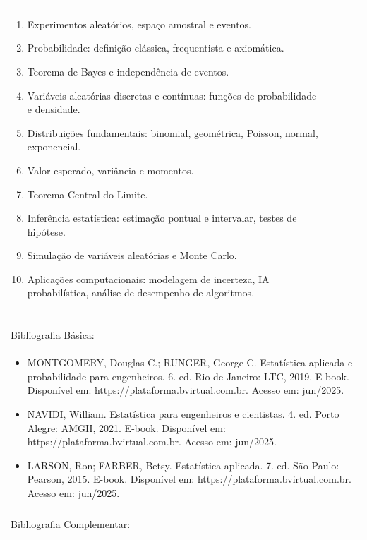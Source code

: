 \documentclass[11pt]{article}
\begin{document}
\begin{center}
\begin{longtable}{|p{4cm}|p{4cm}|p{4cm}|p{4cm}|}
{\begin{enumerate}
\item Experimentos aleatórios, espaço amostral e eventos.
\item Probabilidade: definição clássica, frequentista e axiomática.
\item Teorema de Bayes e independência de eventos.
\item Variáveis aleatórias discretas e contínuas: funções de probabilidade e densidade.
\item Distribuições fundamentais: binomial, geométrica, Poisson, normal, exponencial.
\item Valor esperado, variância e momentos.
\item Teorema Central do Limite.
\item Inferência estatística: estimação pontual e intervalar, testes de hipótese.
\item Simulação de variáveis aleatórias e Monte Carlo.
\item Aplicações computacionais: modelagem de incerteza, IA probabilística, análise de desempenho de algoritmos.\end{enumerate}}\\
\multicolumn{4}{|p{16cm}|}{}\\
\multicolumn{4}{|p{16cm}|}{}\\
\multicolumn{4}{|p{16cm}|}{\vspace{-1cm}}\\
\multicolumn{4}{|p{16cm}|}{}\\
\hline
\multicolumn{4}{|p{16cm}|}{Bibliografia Básica:}\\
\multicolumn{4}{|p{16cm}|}{%
\begin{itemize}\item MONTGOMERY, Douglas C.; RUNGER, George C. Estatística aplicada e probabilidade para engenheiros. 6. ed. Rio de Janeiro: LTC, 2019. E-book. Disponível em: https://plataforma.bvirtual.com.br. Acesso em: jun/2025.
\item NAVIDI, William. Estatística para engenheiros e cientistas. 4. ed. Porto Alegre: AMGH, 2021. E-book. Disponível em: https://plataforma.bvirtual.com.br. Acesso em: jun/2025.
\item LARSON, Ron; FARBER, Betsy. Estatística aplicada. 7. ed. São Paulo: Pearson, 2015. E-book. Disponível em: https://plataforma.bvirtual.com.br. Acesso em: jun/2025.\end{itemize}}\\
\multicolumn{4}{|p{16cm}|}{}\\
\hline
\multicolumn{4}{|p{16cm}|}{Bibliografia Complementar:}\\

\end{longtable}
\end{center}
\end{document}
